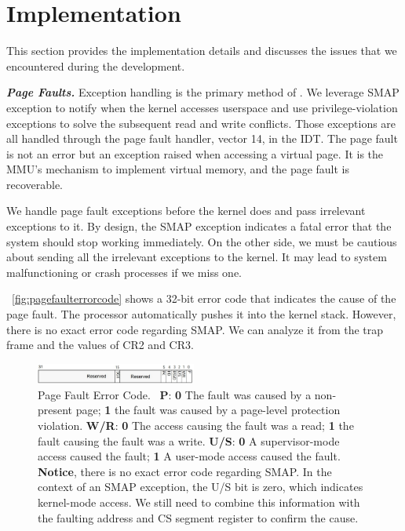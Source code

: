 

\section{Implementation}
\label{sec:ktoctou-implementation}

This section provides the implementation details and discusses the issues that we encountered during the development.



\textbf{\textit{Page Faults.}} Exception handling is the primary method of \name. We leverage SMAP exception to notify when the kernel accesses userspace and use privilege-violation exceptions to solve the subsequent read and write conflicts. Those exceptions are all handled through the page fault handler, vector 14, in the IDT. The page fault is not an error but an exception raised when accessing a virtual page. It is the MMU's mechanism to implement virtual memory, and the page fault is recoverable. 

We handle page fault exceptions before the kernel does and pass irrelevant exceptions to it. By design, the SMAP exception indicates a fatal error that the system should stop working immediately. On the other side, we must be cautious about sending all the irrelevant exceptions to the kernel. It may lead to system malfunctioning or crash processes if we miss one. 

~\autoref{fig:pagefaulterrorcode} shows a 32-bit error code that indicates the cause of the page fault. The processor automatically pushes it into the kernel stack. However, there is no exact error code regarding SMAP.  We can analyze it from the trap frame and the values of CR2 and CR3.


\begin{figure}[th]
  \includegraphics[width=0.47\textwidth]{figures/pagefaulterrorcode2}
  \centering
  \caption{Page Fault Error Code.~\cite{intelinterrupt} \textbf{P}: \textbf{0} The fault was caused by a non-present page; \textbf{1} the fault was caused by a page-level protection violation. \textbf{W/R}: \textbf{0} The access causing the fault was a read; \textbf{1} the fault causing the fault was a write. \textbf{U/S}: \textbf{0} A supervisor-mode access caused the fault; \textbf{1} A user-mode access caused the fault. \textbf{Notice}, there is no exact error code regarding SMAP. In the context of an SMAP exception, the U/S bit is zero, which indicates kernel-mode access. We still need to combine this information with the faulting address and CS segment register to confirm the cause.}
  \label{fig:pagefaulterrorcode}
\end{figure}



